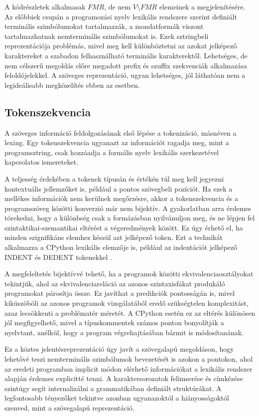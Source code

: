 \documentclass[twoside, 12pt]{report}
\begin{document}
A kódrészletek alkalmasak $FMR$, de nem $V \setminus FMR$ elemeinek a megjelenítésére. Az előbbiek csupán a programozási nyelv lexikális rendszere szerint definiált terminális szimbólumokat tartalmazzák, a mondatformák viszont tartalmazhatnak nemterminális szimbólumokat is. Ezek sztringbeli reprezentációja problémás, mivel meg kell különböztetni az azokat jelképező karaktereket a szabadon felhasználható terminális karakterektől. Lehetséges, de nem célszerű megoldás előre megadott prefix és szuffix szekvenciák alkalmazása feloldójelekkel. A szöveges reprezentáció, ugyan lehetséges, jól láthatóan nem a legideálisabb megközelítés ebben az esetben.

\subsection{Tokenszekvencia}

A szöveges információ feldolgozásának első lépése a tokenizáció, másnéven a lexing. Egy tokenszekvencia ugyanazt az információt ragadja meg, mint a programsztring, csak hozzáadja a formális nyelv lexikális szerkezetével kapcsolatos ismereteket.

A teljesség érdekében a tokenek típusán és értékén túl meg kell jegyezni kontextuális jellemzőket is, például a pontos szövegbeli pozíciót. Ha ezek a mellékes információk nem kerülnek megőrzésre, akkor a tokenszekvencia és a programszöveg közötti konverzió már nem bijektív. A gyakorlatban arra érdemes törekedni, hogy a különbség csak a formázásban nyilvánuljon meg, és ne lépjen fel szintaktikai-szemantikai eltérést a végeredmények között. Ez úgy érhető el, ha minden szignifikáns elemhez készül azt jelképező token. Ezt a technikát alkalmazza a CPython lexikális elemzője is, például az indentációt jelképező INDENT és DEDENT tokenekkel \parencite{PSF20a}.

A megfeleltetés bijektívvé tehető, ha a programok közötti ekvivalenciaosztályokat tekintjük, ahol az ekvivalenciareláció az azonos szintaxisfákat produkáló programokat párosítja össze. Ez javíthat a predikciók pontosságán is, mivel kiküszöböli az azonos programok vizsgálatából eredő szükségtelen komplexitást, azaz lecsökkenti a problématér méretét. A CPython esetén ez az eltérés különösen jól megfigyelhető, mivel a típuskommentek számos ponton bonyolítják a nyelvtant, anélkül, hogy a program végrehajtásában bármit is módosítanának.

Ez a köztes jelentésreprezentáció úgy javít a szövegalapú megoldáson, hogy lehetővé teszi nemterminális szimbólumok bevezetését is azokon a pontokon, ahol az eredeti programban implicit módon elérhető információkat a lexikális rendszer alapján érdemes explicitté tenni. A karaktersorozatok felimserése és címkézése szintúgy segít internalizálni a grammatikában definiált struktúrákat. A legfontosabb tényezőket tekintve azonban ugyanazoktól a hiányosságoktól szenved, mint a szövegalapú reprezentáció.
\end{document}
